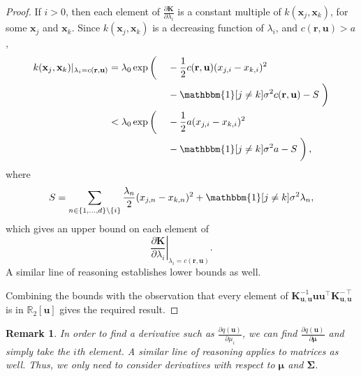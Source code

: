 \documentclass{mpaper}
\newtheorem{remark}[theorem]{Remark}
\newcommand{\Kuu}{\mathbf{K}_{\mathbf{u},\mathbf{u}}}
\begin{document}
\begin{proof}
  If $i > 0$, then each element of $\frac{\partial \mathbf{K}}{\partial
    \lambda_i}$ is a constant multiple of $k(\mathbf{x}_j,
  \mathbf{x}_k)$, for some $\mathbf{x}_j$ and $\mathbf{x}_k$. Since
  $k(\mathbf{x}_j, \mathbf{x}_k)$ is a decreasing function of
  $\lambda_i$, and $c(\mathbf{r}, \mathbf{u}) > a$,
  \begin{alignat*}{3}
    k(\mathbf{x}_j, \mathbf{x}_k)|_{\lambda_i = c(\mathbf{r},
      \mathbf{u})} &= \lambda_0 \exp \left( \vphantom{\frac{1}{2}} \right. &&
    -\frac{1}{2} c(\mathbf{r}, \mathbf{u})(x_{j,i} - x_{k,i})^2 \\
    & && - \mathbbm{1}[j \ne k]\sigma^2c(\mathbf{r}, \mathbf{u}) - S \left.
      \vphantom{\frac{1}{2}} \right) \\
    &< \lambda_0 \exp \left( \vphantom{\frac{1}{2}} \right. && -\frac{1}{2}
    a(x_{j,i} - x_{k,i})^2 \\
    & && - \mathbbm{1}[j \ne k]\sigma^2a - S \left. \vphantom{\frac{1}{2}}
    \right),
  \end{alignat*}
  where
  \[
    S = \sum_{n \in \{ 1, \dots, d \} \setminus \{ i \}} \frac{\lambda_n}{2}
    (x_{j,n} - x_{k,n})^2 + \mathbbm{1}[j \ne k]\sigma^2 \lambda_n,
  \]
  which gives an upper bound on each element of
  \[
    \left. \frac{\partial \mathbf{K}}{\partial \lambda_i} \right|_{\lambda_i =
      c(\mathbf{r}, \mathbf{u})}.
  \]
  A similar line of reasoning establishes lower bounds as well.

  Combining the bounds with the observation that
  every element of
  $\Kuu^{-1}\mathbf{u}\mathbf{u}^\intercal\Kuu^{-\intercal}$ is in
  $\mathbb{R}_2[\mathbf{u}]$ gives the required result.
\end{proof}

\begin{remark}
  In order to find a derivative such as $\frac{\partial q(\mathbf{u})}{\partial
    \mu_i}$, we can find $\frac{\partial q(\mathbf{u})}{\partial \bm\mu}$ and
  simply take the $i$th element. A similar line of reasoning applies to matrices
  as well. Thus, we only need to consider derivatives with respect to $\bm\mu$
  and $\bm\Sigma$.
\end{remark}
\end{document}
